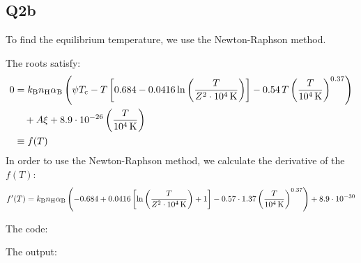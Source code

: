 \subsection{Q2b}

To find the equilibrium temperature, we use the Newton-Raphson method.

The roots satisfy:
\begin{align}
    0 & = k_{\rm B} n_{\rm H} \alpha_{\rm B}
    \left(
        \psi T_{\rm c} - T\left[0.684 - 0.0416 \ln\left(\frac{T}{Z^2 \cdot 10^4 \rm \, K}\right) \right]
        - 0.54 \, T \left(\frac{T}{10^{4} \rm \, K}\right)^{0.37}
    \right) \\
        & \quad + A \xi 
        + 8.9\cdot10^{-26} \left(\frac{T}{10^{4} \rm \, K}\right) \\
        & \equiv f(T)
\end{align}
In order to use the Newton-Raphson method, we calculate the derivative of the $f(T)$:
\begin{equation}
    f'(T) = k_{\rm B} n_{\rm H} \alpha_{\rm B}
    \left(
    -0.684
    + 0.0416 \left[\ln\left(\frac{T}{Z^2 \cdot 10^4 \rm \, K}\right) + 1\right]
    - 0.57 \cdot 1.37 \left(\frac{T}{10^{4} \rm \, K}\right)^{0.37}
    \right)
    + 8.9 \cdot 10^{-30}
\end{equation}

\noindent The code:



\noindent The output:


